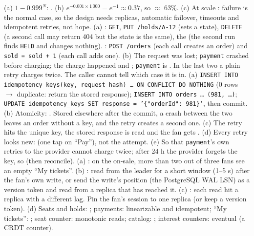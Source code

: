  (a) $1 - 0.999^N$: . (b) $e^{-0.001 \times 1\,000} = e^{-1} \approx 0.37$, so $\approx$ 63\%. (c) At scale : failure is the normal case, so the design needs replicas, automatic failover, timeouts and idempotent retries, not hope.
 (a) : \texttt{GET}, \texttt{PUT /holds/A-12} (sets a state), \texttt{DELETE} (a second call may return 404 but the state is the same), the  (the second run finds \texttt{HELD} and changes nothing). : \texttt{POST /orders} (each call creates an order) and \texttt{sold = sold + 1} (each call adds one). (b) The request was lost; \texttt{payment} crashed before charging; the charge happened and ; \texttt{payment} is . In the last two a plain retry charges twice. The caller cannot tell which case it is in.
 (a) \texttt{INSERT INTO idempotency\_keys(key, request\_hash) \dots{} ON CONFLICT DO NOTHING} (0 rows $\to$ duplicate: return the stored response); \texttt{INSERT INTO orders \dots{} (981, \dots)}; \texttt{UPDATE idempotency\_keys SET response = '\{"orderId": 981\}'}, then commit. (b) Atomicity: . Stored elsewhere after the commit, a crash between the two leaves an order without a key, and the retry creates a second one. (c) The retry hits the unique key, the stored response is read and the fan gets . (d) Every retry looks new:  (one tap on ``Pay''), not the attempt. (e) So that \texttt{payment}'s own retries to the provider cannot charge twice; after 24 h the provider forgets the key, so  (then reconcile).
 (a) : on the on-sale, more than two out of three fans see an empty ``My tickets''. (b) : read from the leader for a short window (1--5 s) after the fan's own write, or send the write's position (the PostgreSQL WAL LSN) as a version token and read from a replica that has reached it. (c) : each read hit a replica with a different lag. Pin the fan's session to one replica (or keep a version token). (d) Seats and holds: ; payments: linearizable and idempotent; ``My tickets'': ; seat counter: monotonic reads; catalog: ; interest counters: eventual (a CRDT counter).
